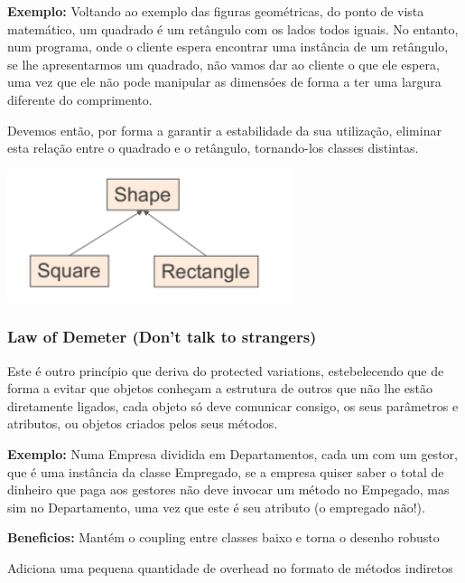 \documentclass{article}
\begin{document}
\begin{flushleft}
    \textbf{Exemplo:} Voltando ao exemplo das figuras geométricas, do ponto de vista matemático, um quadrado é um
    retângulo com os lados todos iguais. No entanto, num programa, onde o cliente espera encontrar uma
    instância de um retângulo, se lhe apresentarmos um quadrado, não vamos dar ao cliente o que ele espera,
    uma vez que ele não pode manipular as dimensóes de forma a ter uma largura diferente do comprimento.

    Devemos então, por forma a garantir a estabilidade da sua utilização, eliminar esta relação entre o
    quadrado e o retângulo, tornando-los classes distintas.

    \begin{center}
        \includegraphics[scale=0.5]{Images/21.png}
    \end{center}
\end{flushleft}

\subsubsection{Law of Demeter (Don’t talk to strangers)}

Este é outro princípio que deriva do protected variations, estebelecendo que de
forma a evitar que objetos conheçam a estrutura de outros que não lhe estão
diretamente ligados, cada objeto só deve comunicar consigo, os seus parâmetros e
atributos, ou objetos criados pelos seus métodos.

\begin{flushleft}
    \textbf{Exemplo:} Numa Empresa dividida em Departamentos, cada um com um gestor, que é uma instância da classe
    Empregado, se a empresa quiser saber o total de dinheiro que paga aos gestores não deve invocar um
    método no Empegado, mas sim no Departamento, uma vez que este é seu atributo (o empregado
    não!).
\end{flushleft}

\begin{flushleft}
    \textbf{Beneficios:} 
    Mantém o coupling entre classes baixo e torna o desenho robusto

    Adiciona uma pequena quantidade de overhead no formato de métodos indiretos
\end{flushleft}
\end{document}
